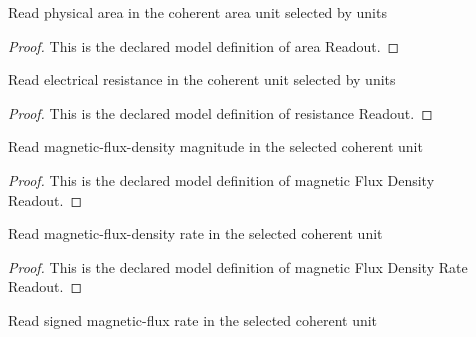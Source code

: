 \begin{definition}
  \label{def:physics:phyx-mini-0935:phyxminiproblems-problemphyxmini0935-areareadout}
  Read physical area in the coherent area unit selected by units
\end{definition}
\begin{proof}
  This is the declared model definition of area Readout.
\end{proof}
\begin{definition}
  \label{def:physics:phyx-mini-0935:phyxminiproblems-problemphyxmini0935-resistancereadout}
  Read electrical resistance in the coherent unit selected by units
\end{definition}
\begin{proof}
  This is the declared model definition of resistance Readout.
\end{proof}
\begin{definition}
  \label{def:physics:phyx-mini-0935:phyxminiproblems-problemphyxmini0935-magneticfluxdensityreadout}
  Read magnetic-flux-density magnitude in the selected coherent unit
\end{definition}
\begin{proof}
  This is the declared model definition of magnetic Flux Density Readout.
\end{proof}
\begin{definition}
  \label{def:physics:phyx-mini-0935:phyxminiproblems-problemphyxmini0935-magneticfluxdensityratereadout}
  Read magnetic-flux-density rate in the selected coherent unit
\end{definition}
\begin{proof}
  This is the declared model definition of magnetic Flux Density Rate Readout.
\end{proof}
\begin{definition}
  \label{def:physics:phyx-mini-0935:phyxminiproblems-problemphyxmini0935-signedmagneticfluxratereadout}
  Read signed magnetic-flux rate in the selected coherent unit
\end{definition}
